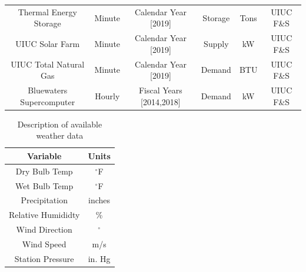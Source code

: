 \begin{landscape}
\begin{table}
\begin{tabular}{c|c|c|c|c|c}
      Thermal Energy Storage & Minute & Calendar Year [2019] & Storage & Tons & UIUC F\&S\\
      UIUC Solar Farm & Minute & Calendar Year [2019] & Supply & kW & UIUC F\&S\\
      UIUC Total Natural Gas & Minute & Calendar Year [2019] & Demand & BTU & UIUC F\&S\\
      Bluewaters Supercomputer & Hourly & Fiscal Years [2014,2018] & Demand & kW & UIUC F\&S\\
    \end{tabular}
  \end{table}
\end{landscape}


\begin{table}
  \centering
  \caption{Description of available weather data}
  \label{tab:weather}
  \begin{tabular}{c|c}
  \hline
  Variable  & Units\\
  \hline
  Dry Bulb Temp  & $^\circ$F\\
  Wet Bulb Temp  & $^\circ$F\\
  Precipitation  & inches \\
  Relative Humididty  & \%\\
  Wind Direction  & $^\circ$\\
  Wind Speed  & m/s\\
  Station Pressure & in. Hg \\
  \end{tabular}
\end{table}
